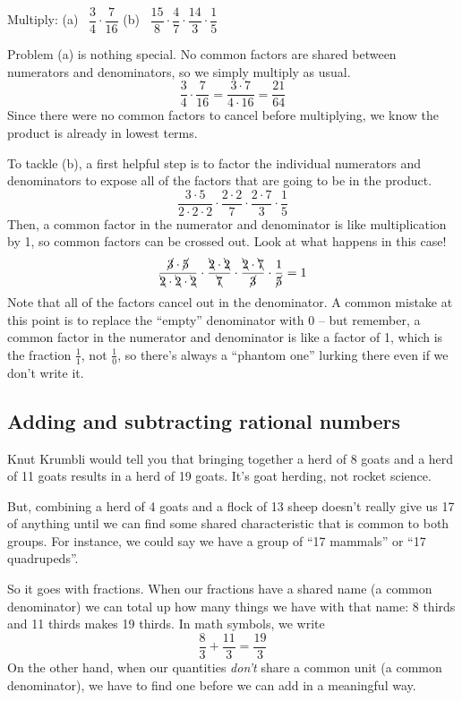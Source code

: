 \begin{boxex}
Multiply: (a)~ $\dfrac{3}{4} \cdot \dfrac{7}{16}$ \qquad (b)~ $\dfrac{15}{8}\cdot\dfrac{4}{7}\cdot\dfrac{14}{3}\cdot\dfrac{1}{5}$

Problem (a) is nothing special. No common factors are shared between numerators and denominators, so we simply multiply as usual.\[\frac{3}{4} \cdot \frac{7}{16} = \frac{3 \cdot 7}{4 \cdot 16} = \frac{21}{64}\] Since there were no common factors to cancel before multiplying, we know the product is already in lowest terms.

To tackle (b), a first helpful step is to factor the individual numerators and denominators to expose all of the factors that are going to be in the product. \[\frac{3\cdot 5}{2 \cdot 2 \cdot 2} \cdot \frac{2 \cdot 2}{7} \cdot \frac{2 \cdot 7}{3} \cdot \frac{1}{5}\]
Then, a common factor in the numerator and denominator is like multiplication by 1, so common factors can be crossed out. Look at what happens in this case!
\[\frac{\cancel{3}\cdot \cancel{5}}{\bcancel{2} \cdot \bcancel{2} \cdot \bcancel{2}} \cdot \frac{\bcancel{2} \cdot \bcancel{2}}{\bcancel{7}} \cdot \frac{\bcancel{2} \cdot \bcancel{7}}{\cancel{3}} \cdot \frac{1}{\cancel{5}} = 1\]
Note that all of the factors cancel out in the denominator. A common mistake at this point is to replace the ``empty'' denominator with 0 -- but remember, a common factor in the numerator and denominator is like a factor of 1, which is the fraction $\frac{1}{1}$, not $\frac{1}{0}$, so there's always a ``phantom one'' lurking there even if we don't write it.
\end{boxex}

\subsection{Adding and subtracting rational numbers}

Knut Krumbli would tell you that bringing together a herd of 8 goats and a herd of 11 goats results in a herd of 19 goats. It's goat herding, not rocket science.

But, combining a herd of 4 goats and a flock of 13 sheep doesn't really give us 17 of anything until we can find some shared characteristic that is common to both groups. For instance, we could say we have a group of ``17 mammals'' or ``17 quadrupeds''.

So it goes with fractions. When our fractions have a shared name (a common denominator) we can total up how many things we have with that name: 8 thirds and 11 thirds makes 19 thirds. In math symbols, we write
\[\frac{8}{3} + \frac{11}{3} = \frac{19}{3}\]
On the other hand, when our quantities \textit{don't} share a common unit (a common denominator), we have to find one before we can add in a meaningful way.


